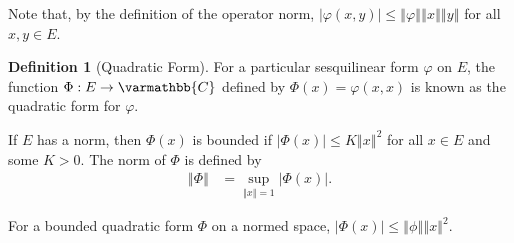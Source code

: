 \documentclass[12pt]{extarticle}
\newcommand{\C}{\varmathbb{C}}
\newcommand{\norm}[1]{\left\Vert #1\right\Vert}
\theoremstyle{plain}
\theoremstyle{definition}
\newtheorem*{definition}{Definition}
\theoremstyle{remark}
\renewcommand{\newline}{\hfill\break}
\begin{document}
  Note that, by the definition of the operator norm, $\left\vert \varphi(x,y) \right\vert\leq \norm{\varphi}\norm{x}\norm{y}$ for all $x,y\in E$.
  \begin{definition}[Quadratic Form]
    For a particular sesquilinear form $\varphi$ on $E$, the function $\Phi: E\rightarrow \C$ defined by $\Phi(x) = \varphi(x,x)$ is known as the quadratic form for $\varphi$.\newline

    If $E$ has a norm, then $\Phi(x)$ is bounded if $\left\vert \Phi(x) \right\vert\leq K\norm{x}^2$ for all $x\in E$ and some $K > 0$. The norm of $\Phi$ is defined by
    \begin{align*}
      \norm{\Phi} &= \sup_{\norm{x} = 1}\left\vert \Phi(x) \right\vert.
    \end{align*}
  \end{definition}
  For a bounded quadratic form $\Phi$ on a normed space, $\left\vert \Phi(x) \right\vert\leq \norm{\phi}\norm{x}^2$.\newline
\end{document}
